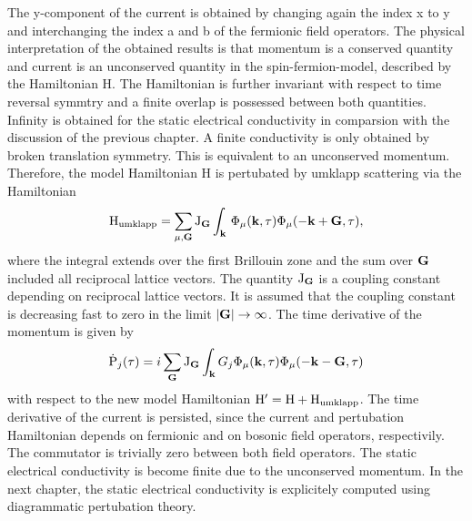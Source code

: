 %
The y-component of the current is obtained by changing again the index x to y and interchanging the index a and b of the fermionic field operators.
The physical interpretation of the obtained results is that momentum is a conserved quantity and current is an unconserved quantity in the spin-fermion-model, described by the Hamiltonian H.
The Hamiltonian is further invariant with respect to time reversal symmtry and a finite overlap is possessed between both quantities.
Infinity is obtained for the static electrical conductivity in comparsion with the discussion of the previous chapter.
A finite conductivity is only obtained by broken translation symmetry.
This is equivalent to an unconserved momentum.
Therefore, the model Hamiltonian H is pertubated by umklapp scattering via the Hamiltonian
%
\begin{align}
	\mathrm{H}_{\mathrm{umklapp}} = \sum\limits_{\mu, \vb{G}} \mathrm{J}_{\vb{G}}
		\int_{\vb{k}}\, \Phi_{\mu}(\vb{k},\tau) \Phi_{\mu}(-\vb{k}+\vb{G},\tau),
	\label{eq:Hamiltonian umklapp scattering}
\end{align}
%
where the integral extends over the first Brillouin zone and the sum over $\vb{G}$ included all reciprocal lattice vectors.
The quantity $\mathrm{J}_{\vb{G}}$ is a coupling constant depending on reciprocal lattice vectors.
It is assumed that the coupling constant is decreasing fast to zero in the limit $|\vb{G}| \to \infty$.
The time derivative of the momentum is given by
%
\begin{align}
	\dot{\mathrm{P}}_{j}(\tau) = i \sum\limits_{\vb{G}} \mathrm{J}_{\vb{G}} \int_{\vb{k}} G_{j} \Phi_{\mu}(\vb{k},\tau) \Phi_{\mu}(-\vb{k} - \vb{G},\tau)
	\label{eq:time derivative momentum finite}
\end{align}
%
with respect to the new model Hamiltonian $\mathrm{H}' = \mathrm{H} + \mathrm{H}_{\mathrm{umklapp}}$.
The time derivative of the current is persisted, since the current and pertubation Hamiltonian depends on fermionic and on bosonic field operators, respectivily.
The commutator is trivially zero between both field operators.
The static electrical conductivity is become finite due to the unconserved momentum.
In the next chapter, the static electrical conductivity is explicitely computed using diagrammatic pertubation theory.














